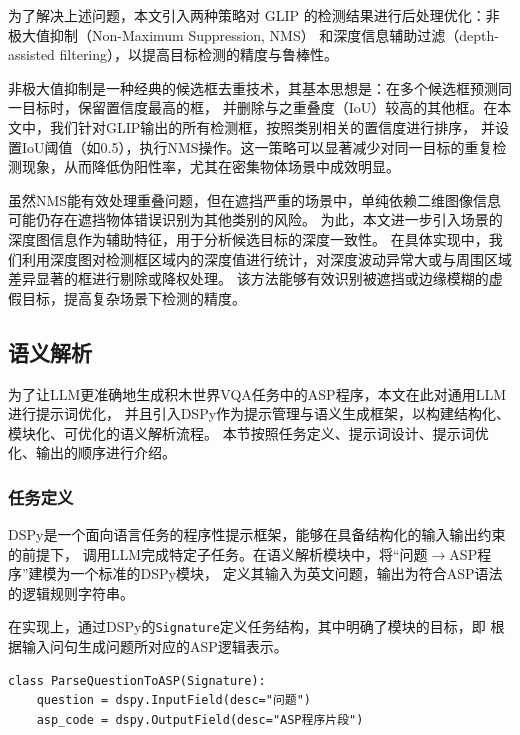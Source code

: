 为了解决上述问题，本文引入两种策略对 GLIP 的检测结果进行后处理优化：非极大值抑制（Non-Maximum Suppression, NMS）
和深度信息辅助过滤（depth-assisted filtering），以提高目标检测的精度与鲁棒性。

非极大值抑制是一种经典的候选框去重技术，其基本思想是：在多个候选框预测同一目标时，保留置信度最高的框，
并删除与之重叠度（IoU）较高的其他框。在本文中，我们针对GLIP输出的所有检测框，按照类别相关的置信度进行排序，
并设置IoU阈值（如0.5），执行NMS操作。这一策略可以显著减少对同一目标的重复检测现象，从而降低伪阳性率，尤其在密集物体场景中成效明显。

虽然NMS能有效处理重叠问题，但在遮挡严重的场景中，单纯依赖二维图像信息可能仍存在遮挡物体错误识别为其他类别的风险。
为此，本文进一步引入场景的深度图信息作为辅助特征，用于分析候选目标的深度一致性。
在具体实现中，我们利用深度图对检测框区域内的深度值进行统计，对深度波动异常大或与周围区域差异显著的框进行剔除或降权处理。
该方法能够有效识别被遮挡或边缘模糊的虚假目标，提高复杂场景下检测的精度。
\subsection{语义解析}
为了让LLM更准确地生成积木世界VQA任务中的ASP程序，本文在此对通用LLM进行提示词优化，
并且引入DSPy作为提示管理与语义生成框架，以构建结构化、模块化、可优化的语义解析流程。
本节按照任务定义、提示词设计、提示词优化、输出的顺序进行介绍。
\subsubsection{任务定义}
DSPy是一个面向语言任务的程序性提示框架，能够在具备结构化的输入输出约束的前提下，
调用LLM完成特定子任务。在语义解析模块中，将“问题$\rightarrow$ASP程序”建模为一个标准的DSPy模块，
定义其输入为英文问题，输出为符合ASP语法的逻辑规则字符串。

在实现上，通过DSPy的\texttt{Signature}定义任务结构，其中明确了模块的目标，即
根据输入问句生成问题所对应的ASP逻辑表示。
\begin{lstlisting}
class ParseQuestionToASP(Signature):
    question = dspy.InputField(desc="问题")
    asp_code = dspy.OutputField(desc="ASP程序片段")
\end{lstlisting}

